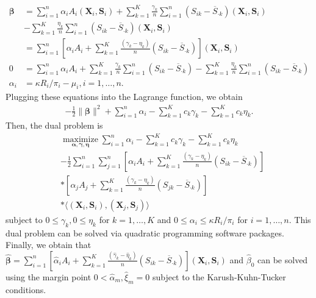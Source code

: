 \documentclass[12pt]{article}
\theoremstyle{plain}
\theoremstyle{definition}
\theoremstyle{remark}
\begin{document}
\begin{equation}
\label{e13}
\begin{aligned}
\boldsymbol{\beta}&=\sum_{i=1}^n \alpha_i A_i (\boldsymbol{X}_i,\boldsymbol{S}_i)+\sum_{k=1}^K\frac{\gamma_k }{n}\sum_{i=1}^n({S}_{ik}-\overline{S}_{\cdot k})(\boldsymbol{X}_i,\boldsymbol{S}_i)\\
&-\sum_{k=1}^K\frac{\eta_k }{n}\sum_{i=1}^n({S}_{ik}-\overline{S}_{\cdot k})(\boldsymbol{X}_i,\boldsymbol{S}_i) \\
&=\sum_{i=1}^n[\alpha_i A_i +\sum_{k=1}^K\frac{(\gamma_k-\eta_k)}{n}({S}_{ik}-\overline{S}_{\cdot k})] (\boldsymbol{X}_i,\boldsymbol{S}_i) \\
0&=\sum_{i=1}^n \alpha_i A_i+\sum_{k=1}^K\frac{\gamma_k }{n}\sum_{i=1}^n({S}_{ik}-\overline{S}_{\cdot k})- \sum_{k=1}^K\frac{\eta_k }{n}\sum_{i=1}^n({S}_{ik}-\overline{S}_{\cdot k})\\
\alpha_i&=\kappa R_i / \pi_i-\mu_i, i=1,\ldots, n.
\nonumber
\end{aligned}
\end{equation}
Plugging these equations into the Lagrange function, we obtain
\begin{equation}
\begin{aligned}
-\frac{1}{2}\|\boldsymbol{\beta}\|^2
+\sum_{i=1}^n \alpha_i
-\sum_{k=1}^Kc_k\gamma_k
-\sum_{k=1}^Kc_k\eta_k.
\nonumber
\end{aligned}
\end{equation}
Then, the dual problem is
\begin{equation}
\label{14}
\begin{aligned}
&\underset{\boldsymbol{\alpha},  \boldsymbol{\gamma},  \boldsymbol{\eta}}{\operatorname{maximize}}
\sum_{i=1}^n \alpha_i
-\sum_{k=1}^Kc_k\gamma_k
-\sum_{k=1}^Kc_k\eta_k\\
&-\frac{1}{2}\sum_{i=1}^n\sum_{j=1}^n[\alpha_i A_i +\sum_{k=1}^K\frac{(\gamma_k-\eta_k)}{n}({S}_{ik}-\overline{S}_{\cdot k})]\\
&*[\alpha_j A_j +\sum_{k=1}^K\frac{(\gamma_k-\eta_k)}{n}(S_{jk}-\overline{S}_{\cdot k})]\\
&* \langle(\boldsymbol{X}_i,\boldsymbol{S}_i),(\boldsymbol{X}_j,\boldsymbol{S}_j) \rangle
\end{aligned}
\end{equation}
subject to $0\leq \gamma_k, 0\leq\eta_k$ for $ k=1,\ldots, K$ and $0\leq \alpha_i \leq \kappa R_i / \pi_i$ for $ i=1, \ldots, n$.
This dual problem can be  solved via quadratic programming software packages.
Finally, we obtain that $ \widehat{\boldsymbol{\beta}}=\sum_{i=1}^n[\widehat{\alpha}_i A_i +\sum_{k=1}^K\frac{(\widehat{\gamma}_k-\widehat{\eta}_k)}{n}({S}_{ik}-\overline{S}_{\cdot k})] (\boldsymbol{X}_i,\boldsymbol{S}_i)$ and $\widehat{\beta}_0$ can be solved using the margin point $0<\widehat{\alpha}_m, \widehat{\xi}_m=0$ subject to the Karush-Kuhn-Tucker conditions.
\end{document}
